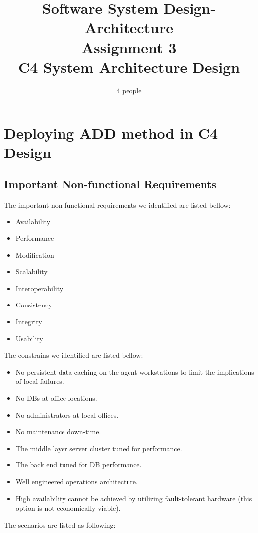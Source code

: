 \documentclass{article}
\title{Software System Design-Architecture\\Assignment 3\\C4 System Architecture Design}
\author{4 people}
\begin{document}
	\maketitle
	\newpage
	\section{Deploying ADD method in C4 Design}
	\subsection{Important Non-functional Requirements}
	The important non-functional requirements we identified are listed bellow:
	\begin{itemize}
		\item {Availability}
		\item {Performance}
		\item {Modification}
		\item {Scalability}
		\item {Interoperability}
		\item {Consistency}
		\item {Integrity}
		\item {Usability}
	\end{itemize}
	The constrains we identified are listed bellow:

	\begin{itemize}
		\item No persistent data caching on the agent workstations to limit the implications of local failures.
		\item No DBs at office locations.
		\item No administrators at local offices.
		\item No maintenance down-time.
		\item The middle layer server cluster tuned for performance.
		\item The back end tuned for DB performance.
		\item Well engineered operations architecture.
		\item High availability cannot be achieved by utilizing fault-tolerant hardware (this option is not
		economically viable).
	\end{itemize}
	The scenarios are listed as following:
\end{document}

